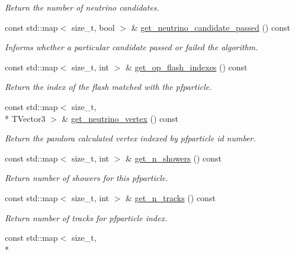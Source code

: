 \begin{DoxyCompactItemize}
\begin{DoxyCompactList}\small\item\em Return the number of neutrino candidates. \end{DoxyCompactList}\item 
const std\-::map$<$ size\-\_\-t, bool $>$ \& \hyperlink{classlee_1_1ElectronEventSelectionAlg_ab34dc2b97e0065b07a5233e3b46b83a4}{get\-\_\-neutrino\-\_\-candidate\-\_\-passed} () const 
\begin{DoxyCompactList}\small\item\em Informs whether a particular candidate passed or failed the algorithm. \end{DoxyCompactList}\item 
const std\-::map$<$ size\-\_\-t, int $>$ \& \hyperlink{classlee_1_1ElectronEventSelectionAlg_affda5b411008752c1355a9dd3a1d9c1e}{get\-\_\-op\-\_\-flash\-\_\-indexes} () const 
\begin{DoxyCompactList}\small\item\em Return the index of the flash matched with the pfparticle. \end{DoxyCompactList}\item 
const std\-::map$<$ size\-\_\-t, \\*
T\-Vector3 $>$ \& \hyperlink{classlee_1_1ElectronEventSelectionAlg_ac098d39d04f407c9bfc574da4b82fee6}{get\-\_\-neutrino\-\_\-vertex} () const 
\begin{DoxyCompactList}\small\item\em Return the pandora calculated vertex indexed by pfparticle id number. \end{DoxyCompactList}\item 
const std\-::map$<$ size\-\_\-t, int $>$ \& \hyperlink{classlee_1_1ElectronEventSelectionAlg_a43afa7fb8c10333f89774c6d4ea714dc}{get\-\_\-n\-\_\-showers} () const 
\begin{DoxyCompactList}\small\item\em Return number of showers for this pfparticle. \end{DoxyCompactList}\item 
const std\-::map$<$ size\-\_\-t, int $>$ \& \hyperlink{classlee_1_1ElectronEventSelectionAlg_ad24d64eca5e56d0550572b24d5e213f7}{get\-\_\-n\-\_\-tracks} () const 
\begin{DoxyCompactList}\small\item\em Return number of tracks for pfparticle index. \end{DoxyCompactList}\item 
const std\-::map$<$ size\-\_\-t, \\*

\end{DoxyCompactItemize}
